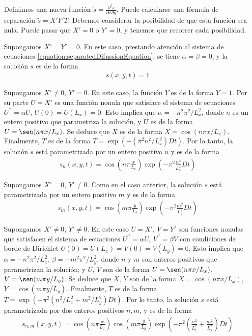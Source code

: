 \documentclass{article}
\begin{document}
  Definimos una nueva función \(\tilde{s} = \frac{\partial^2 s}{\partial x \partial y}\).
  Puede calcularse una fórmula de separación \(\tilde{s} = X' Y' T\).
  Debemos considerar la posibilidad de que esta función sea nula.
  Puede pasar que \(X' = 0\) o \(Y' = 0\), y tenemos que recorrer cada posibilidad.

  Supongamos \(X' = Y' = 0\).
  En este caso, prestando atención al sistema de ecuaciones \eqref{equation:separatedDifussionEquation}, se tiene \(\alpha = \beta = 0\), y la solución \(s\) es de la forma 
  \begin{align}
    \label{equation:bareSolution}
    s(x, y, t) = 1
  \end{align}

  Supongamos \(X' \neq 0\), \(Y' = 0\).
  En este caso, la función \(Y\) es de la forma \(Y = 1\).
  Por su parte \(U = X'\) es una función nonula que satisface el sistema de ecuaciones \(U^{\prime\prime} = \alpha U\), \(U(0) = U(L_x) = 0\).
  Esto implica que \(\alpha = - n^2 \pi^2 / L_x^2\), donde \(n\) es un entero positivo que parametriza la solución, y \(U\) es de la forma \(U = \sen(n \pi x / L_x)\).
  Se deduce que \(X\) es de la forma \(X = \cos(n \pi x / L_x)\).
  Finalmente, \(T\) es de la forma \(T = \exp(- (\pi^2 n^2 / L_x^2) D t)\).
  Por lo tanto, la solución \(s\) está parametrizada por un entero positivo \(n\) y es de la forma
  \begin{align}
    \label{equation:alphaSolutions}
    s_n(x, y, t)
    =
    \cos\left( n \pi \frac{x}{L_x} \right) \exp\left( - \pi^2 \frac{n^2}{L_x^2} D t \right)
  \end{align}

  Supongamos \(X' = 0\), \(Y' \neq 0\).
  Como en el caso anterior, la solución \(s\) está parametrizada por un entero positivo \(m\) y es de la forma
  \begin{align}
    \label{equation:betaSolutions}
    s_m(x, y, t)
    =
    \cos\left(m \pi \frac{y}{L_y}\right) \exp\left( - \pi^2 \frac{m^2}{L_y^2} D t \right)
  \end{align}

  Supongamos \(X' \neq 0\), \(Y' \neq 0\).
  En este caso \(U = X'\), \(V = Y'\) son funciones nonulas que satisfacen el sistema de ecuaciones \(U^{\prime\prime} = \alpha U\), \(V^{\prime\prime} = \beta V\) con condiciones de borde de Dirichlet \(U(0) = U(L_x) = V(0) = V(L_y) = 0\).
  Esto implica que \(\alpha = - n^2 \pi^2 / L_x^2\), \(\beta = - m^2 \pi^2 / L_y^2\), donde \(n\) y \(m\) son enteros positivos que parametrizan la solución; y \(U\), \(V\) son de la forma \(U = \sen(n \pi x / L_x)\), \(V = \sen(m \pi y / L_y)\).
  Se deduce que \(X\), \(Y\) son de la forma \(X = \cos(n \pi x / L_x)\), \(Y = \cos(m \pi y / L_y)\).
  Finalmente, \(T\) es de la forma \(T = \exp(- \pi^2 (n^2 / L_x^2 + m^2 / L_y^2) D t)\).
  Por lo tanto, la solución \(s\) está parametrizada por dos enteros positivos \(n, m\), y es de la forma
  \begin{align}
    \label{equation:alphaBetaSolutions}
    s_{n, m}(x, y, t)
    =
    \cos\left( n \pi \frac{x}{L_x} \right)
    \cos\left( m \pi \frac{y}{L_y} \right)
    \exp\left( - \pi^2 \left( \frac{n^2}{L_x^2} + \frac{m^2}{L_y^2} \right) D t \right)
  \end{align}
\end{document}
